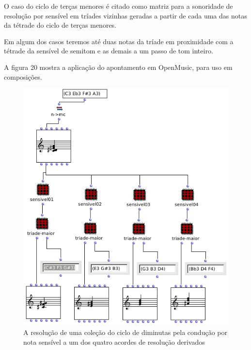 \documentclass[
	12pt,				%
	openright,			%
	twoside,			%
	a4paper,			%
	english,			%
	french,				%
	spanish,			%
	brazil				%
	]{abntex2}
\begin{document}
O caso do ciclo de terças menores é citado como matriz para a sonoridade de resolução por sensível em tríades vizinhas geradas a partir de cada uma das notas da tétrade do ciclo de terças menores. 

Em algum dos casos teremos até duas notas da tríade em proximidade com a tétrade da sensível de semitom e as demais a um passo de tom inteiro. 

A figura 20 mostra a aplicação do apontamento em OpenMusic, para uso em composições.
 

\begin{figure}[!h]
	\caption{\label{fig_grafico}A resolução de uma coleção do ciclo de diminutas pela condução por nota sensível a um dos quatro acordes de resolução derivados   }
	\begin{center}
	    \includegraphics[scale=0.6]{ciclos/sensivel.png}
	\end{center}
\end{figure}

\end{document}
